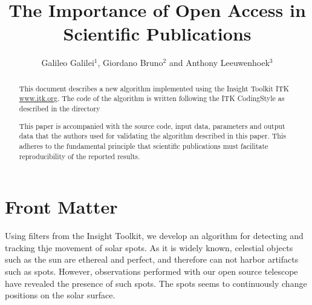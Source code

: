 \documentclass{InsightArticle}
\title{The Importance of Open Access in Scientific Publications}
\author{Galileo Galilei$^{1}$, Giordano Bruno$^{2}$ and Anthony Leeuwenhoek$^{3}$}
\newcommand{\IJhandlerIDnumber}{1338}
\begin{document}
%
%
\IJhandlefooter{\IJhandlerIDnumber}


\ifpdf
\else
\fi


\maketitle


\ifhtml
\chapter*{Front Matter\label{front}}
\fi


\begin{abstract}
\noindent
This document describes a new algorithm implemented using the Insight Toolkit
ITK \url{www.itk.org}.  The code of the algorithm is written following the
ITK CodingStyle as described in the directory


This paper is accompanied with the source code, input data, parameters and
output data that the authors used for validating the algorithm described in
this paper. This adheres to the fundamental principle that scientific
publications must facilitate reproducibility of the reported results.

\end{abstract}

\IJhandlenote{\IJhandlerIDnumber}

\tableofcontents

Using filters from the Insight Toolkit, we develop an algorithm for detecting
and tracking thje movement of solar spots. As it is widely known, celestial
objects such as the sun are ethereal and perfect, and therefore can not harbor
artifacts such as spots. However, observations performed with our open source
telescope have revealed the presence of such spots. The spots seems to continuously change positions on the solar surface.
\end{document}
